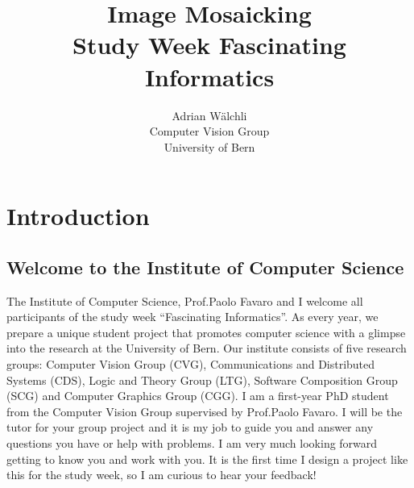 \documentclass[a4paper]{article}
\title{Image Mosaicking \\ Study Week Fascinating Informatics}
\author{Adrian W\"alchli \\ Computer Vision Group \\ University of Bern}
\begin{document}
\maketitle
\tableofcontents
\newpage


\section{Introduction}
	\subsection{Welcome to the Institute of Computer Science}
		The Institute of Computer Science, Prof.\@ Paolo Favaro and I welcome all participants of the study week ``Fascinating Informatics''.
		As every year, we prepare a unique student project that promotes computer science with a glimpse into the research at the University of Bern.
		Our institute consists of five research groups: Computer Vision Group (CVG), Communications and Distributed Systems (CDS), Logic and Theory Group (LTG), Software Composition Group (SCG) and Computer Graphics Group (CGG).
		I am a first-year PhD student from the Computer Vision Group supervised by Prof.\@ Paolo Favaro. 
		I will be the tutor for your group project and it is my job to guide you and answer any questions you have or help with problems.
		I am very much looking forward getting to know you and work with you.
		It is the first time I design a project like this for the study week, so I am curious to hear your feedback!
		
	
\end{document}
